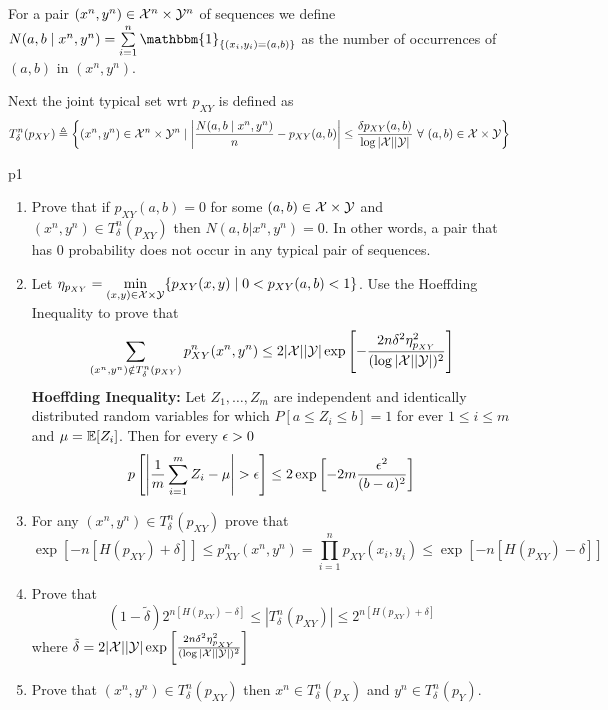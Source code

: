 \documentclass[a4paper, 11pt]{article}
\begin{document}
For a pair $(x^n,y^n)\in \mathcal{X}^n\times \mathcal{Y}^n$ of sequences we define $N(a,b\mid x^n,y^n)=\sum\limits_{i=1}^n\mathbbm{1}_{\{(x_i,y_i)=(a,b)\}}$ as the number of occurrences of $(a,b)$ in $(x^n,y^n)$. 

Next the joint typical set wrt $p_{XY}$ is defined as $$T_{\delta}^n(p_{XY})\triangleq \left\{ (x^n,y^n)\in \mathcal{X}^n\times \mathcal{Y}^n\mid \left|\frac{N(a,b\mid x^n,y^n)}{n}-p_{XY}(a,b)  \right| \leq \frac{\delta p_{XY}(a,b)}{\log |\mathcal{X}||\mathcal{Y}|}\ \forall \ (a,b)\in \mathcal{X}\times \mathcal{Y}\right\}$$
 
\begin{problem}{%
}{p1%
}

\begin{enumerate}
	\item Prove that if $p_{XY}(a,b)=0$ for some $(a,b)\in \mathcal{X}\times \mathcal{Y}$ and $(x^n,y^n)\in T_{\delta}^n(p_{XY})$ then $N(a,b|x^n,y^n)=0$. In other words, a pair that has 0 probability does not occur in any typical pair of sequences.
	\item Let $\eta_{p_{XY}}=\min\limits_{(x,y)\in \mathcal{X}\times \mathcal{Y}}\{p_{XY}(x,y)\mid 0<p_{XY}(a,b)<1\}$. Use the Hoeffding Inequality to prove that $$\sum_{(x^n,y^n)\notin T_{\delta}^n(p_{XY})}p_{XY}^n(x^n,y^n)\leq 2|\mathcal{X}||\mathcal{Y}|\exp\left[- \frac{2n\delta^2\eta^2_{p_{XY}}}{(\log |\mathcal{X}||\mathcal{Y}|)^2}  \right]$$
	\textbf{Hoeffding Inequality:} Let $Z_1,\dots, Z_m$ are independent and identically distributed random variables for which $P[a\leq Z_i\leq b]=1$ for ever $1\leq i\leq m$ and $\mu=\mathbb{E}[Z_i]$. Then for every $\epsilon>0$ $$p\lt[\lt| \frac1m\sum_{i=1}^mZ_i-\mu \rt|>\eps\rt]\leq 2\exp\lt[ -2m\frac{\eps^2}{(b-a)^2}\rt ]$$
	\item For any $(x^n,y^n)\in T_{\delta}^n(p_{XY})$ prove that $$\exp[{-n[H(p_{XY})+\delta]}]\leq p_{XY}^n(x^n,y^n)=\prod_{i=1}^np_{XY}(x_i,y_i)\leq \exp[{-n[H(p_{XY})-\delta]}]$$
	\item Prove that $$(1-\tilde{\delta})2^{n[H(p_{XY})-\delta]}\leq |T_{\delta}^n(p_{XY})|\leq 2^{n[H(p_{XY})+\delta]}$$ where $\tilde{\delta}=2|\mathcal{X}||\mathcal{Y}|\exp\left[  \frac{2n\delta^2\eta^2_{p_{XY}}}{(\log |\mathcal{X}||\mathcal{Y}|)^2}   \right]$
	\item Prove that $(x^n,y^n)\in T_{\delta}^n(p_{XY})$ then $x^n\in T_{\delta}^n (p_X)$ and $y^n\in T_{\delta}^n(p_Y)$.
\end{enumerate}
\end{problem}
\end{document}
